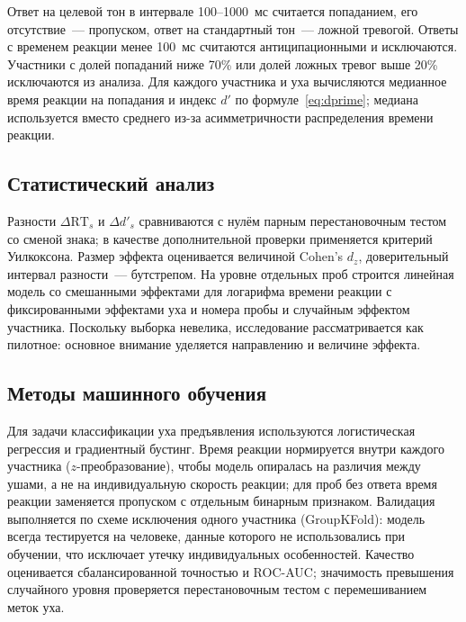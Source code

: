 \documentclass{misisarticle}
\begin{document}
Ответ на целевой тон в интервале 100--1000~мс считается попаданием, его отсутствие~--- пропуском, ответ на стандартный тон~--- ложной тревогой. Ответы с временем реакции менее 100~мс считаются антиципационными и исключаются. Участники с долей попаданий ниже 70\% или долей ложных тревог выше 20\% исключаются из анализа. Для каждого участника и уха вычисляются медианное время реакции на попадания и индекс $d'$ по формуле~\eqref{eq:dprime}; медиана используется вместо среднего из-за асимметричности распределения времени реакции.

\subsection{Статистический анализ}

Разности $\Delta\mathrm{RT}_s$ и $\Delta d'_s$ сравниваются с нулём парным перестановочным тестом со сменой знака; в качестве дополнительной проверки применяется критерий Уилкоксона. Размер эффекта оценивается величиной Cohen's $d_z$, доверительный интервал разности~--- бутстрепом. На уровне отдельных проб строится линейная модель со смешанными эффектами для логарифма времени реакции с фиксированными эффектами уха и номера пробы и случайным эффектом участника. Поскольку выборка невелика, исследование рассматривается как пилотное: основное внимание уделяется направлению и величине эффекта.

\subsection{Методы машинного обучения}

Для задачи классификации уха предъявления используются логистическая регрессия и градиентный бустинг. Время реакции нормируется внутри каждого участника ($z$-преобразование), чтобы модель опиралась на различия между ушами, а не на индивидуальную скорость реакции; для проб без ответа время реакции заменяется пропуском с отдельным бинарным признаком. Валидация выполняется по схеме исключения одного участника (GroupKFold): модель всегда тестируется на человеке, данные которого не использовались при обучении, что исключает утечку индивидуальных особенностей. Качество оценивается сбалансированной точностью и ROC-AUC; значимость превышения случайного уровня проверяется перестановочным тестом с перемешиванием меток уха.
\end{document}
